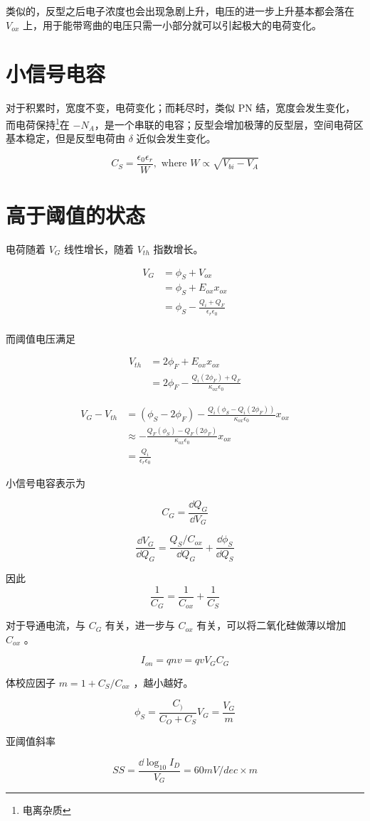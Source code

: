 \documentclass[cn,11pt,chinese,black,simple]{../elegantbook}
\begin{document}
类似的，反型之后电子浓度也会出现急剧上升，电压的进一步上升基本都会落在 \(V_{ox}\) 上，用于能带弯曲的电压只需一小部分就可以引起极大的电荷变化。

\section{小信号电容}

对于积累时，宽度不变，电荷变化；而耗尽时，类似 PN 结，宽度会发生变化，而电荷保持\footnote{电离杂质}在 \(-N_A\)，是一个串联的电容；反型会增加极薄的反型层，空间电荷区基本稳定，但是反型电荷由 \(\delta\) 近似会发生变化。

\[C_S = \frac{\epsilon_0 \epsilon_r}{W}, \text{ where } W \propto \sqrt{V_{bi} - V_A} \]

\section{高于阈值的状态}

电荷随着 \(V_G\) 线性增长，随着 \(V_{th}\) 指数增长。

\[\begin{aligned}
    V_G &= \phi_S + V_{ox}\\
    &= \phi_S + E_{ox} x_{ox} \\
    &= \phi_S - \frac{Q_i + Q_F}{\epsilon_r \epsilon_0} \\
\end{aligned}\]

而阈值电压满足

\[\begin{aligned}
    V_{th} &= 2 \phi_F + E_{ox} x_{ox} \\ 
    &= 2 \phi_F - \frac{Q_i(2\phi_F)+Q_F}{\kappa_{ox} \epsilon_0}
\end{aligned}\]

\[\begin{aligned}
    V_G - V_{th} &= (\phi_S - 2 \phi_F) - \frac{Q_i(\phi_S - Q_i(2 \phi_F))}{\kappa_{ox} \epsilon_0} x_{ox} \\
    &\approx - \frac{Q_F(\phi_S) - Q_F(2 \phi_F)}{\kappa_{ox} \epsilon_0} x_{ox} \\
    &= \frac{Q_i}{\epsilon_r \epsilon_0}
\end{aligned}\] 

小信号电容表示为 

\[C_G = \frac{\dd{Q_{G}}}{\dd{V_{G}}}\]

\[\frac{\dd{V_G}}{\dd{Q_G}} = \frac{Q_S/C_{ox}}{\dd{Q_G}} + \frac{\dd{}\phi_S}{\dd{Q_S}}\]

因此 \[\frac{1}{C_G} = \frac{1}{C_{ox}} + \frac{1}{C_S}\]

对于导通电流，与 \(C_G\) 有关，进一步与 \(C_{ox}\) 有关，可以将二氧化硅做薄以增加 \(C_{ox}\) 。

\[I_{on} = q n v = q v V_G C_G \] 

体校应因子 \(m = 1 + C_S / C_{ox}\) ，越小越好。

\[\phi_S = \frac{C_)}{C_O + C_S}V_G = \frac{V_G}{m}\]

亚阈值斜率 

\[SS = \frac{\dd{\log _{10} I_D}}{V_G} = 60 mV/dec \times m\]



\let\chapname\undefined
\ifx\mainclass\undefined
\end{document}
